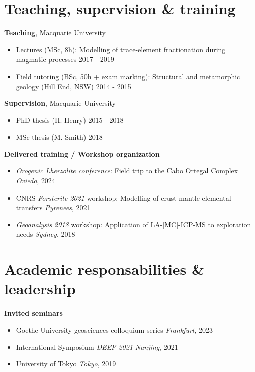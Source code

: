 \documentclass[a4paper,10pt]{article}
\begin{document}
\section{Teaching, supervision \& training}

\textbf{Teaching}, Macquarie University
    \begin{itemize}[label={},itemsep=0pt,parsep=0pt]
        \item Lectures (MSc, 8h): Modelling of trace-element fractionation during magmatic processes \hfill 2017 - 2019 
        \item Field tutoring (BSc, 50h + exam marking): Structural and metamorphic geology (Hill End, NSW) \hfill 2014 - 2015 
    \end{itemize}
    
\textbf{Supervision}, Macquarie University
    \begin{itemize}[label={},itemsep=0pt,parsep=0pt]
    \item PhD thesis (H. Henry)
        \hfill {2015 - 2018}
    \item MSc thesis (M. Smith)
        \hfill {2018}
    \end{itemize}
    
\textbf{Delivered training / Workshop organization}
    \begin{itemize}[label={},itemsep=0pt,parsep=0pt]
        \item \textit{ Orogenic Lherzolite conference}: Field trip to the Cabo Ortegal Complex
        \hfill \textit{Oviedo}, {2024}
        \item CNRS \textit{Forsterite 2021} workshop: Modelling of crust-mantle elemental transfers
        \hfill \textit{Pyrenees}, {2021}
        \item \textit{Geoanalysis 2018} workshop: Application of LA-[MC]-ICP-MS to exploration needs
        \hfill \textit{Sydney}, {2018}
    \end{itemize}
    
\section{Academic responsabilities \& leadership}

    \textbf{Invited seminars}
    \begin{itemize}[label={},itemsep=0pt,parsep=0pt]
        \item Goethe University geosciences colloquium series
            \hfill \textit{Frankfurt}, {2023}
        \item International Symposium \textit{DEEP 2021}
            \hfill \textit{Nanjing}, {2021}
        \item University of Tokyo
            \hfill \textit{Tokyo}, {2019}
    \end{itemize}
\end{document}
